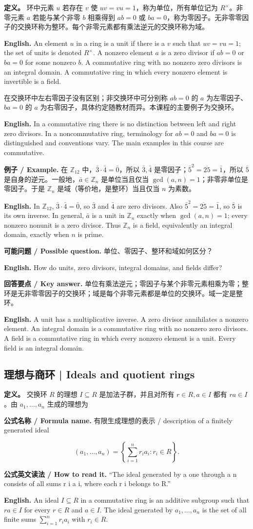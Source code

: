 \documentclass[UTF8,11pt,a4paper]{ctexart}
\newcommand{\EN}[1]{\par\noindent\textbf{English.} #1\par}
\newcommand{\READ}[1]{\par\noindent\textbf{公式英文读法 / How to read it.} #1\par}
\newcommand{\FORMULA}[2]{\par\noindent\textbf{公式名称 / Formula name.} #1 / #2\par}
\newcommand{\EX}[2]{\par\noindent\textbf{例子 / Example.} #1\par\EN{#2}}
\newcommand{\ASK}[4]{\par\noindent\textbf{可能问题 / Possible question.} #1\par\EN{#2}\noindent\textbf{回答要点 / Key answer.} #3\par\EN{#4}\medskip}
\begin{document}
\noindent\textbf{定义。} 环中元素 $u$ 若存在 $v$ 使 $uv=vu=1$，称为单位，所有单位记为 $R^\times$。非零元素 $a$ 若能与某个非零 $b$ 相乘得到 $ab=0$ 或 $ba=0$，称为零因子。无非零零因子的交换环称为整环。每个非零元素都有乘法逆元的交换环称为域。

\EN{An element $u$ in a ring is a unit if there is a $v$ such that $uv=vu=1$; the set of units is denoted $R^\times$. A nonzero element $a$ is a zero divisor if $ab=0$ or $ba=0$ for some nonzero $b$. A commutative ring with no nonzero zero divisors is an integral domain. A commutative ring in which every nonzero element is invertible is a field.}

\noindent 在交换环中左右零因子没有区别；非交换环中可分别称 $ab=0$ 的 $a$ 为左零因子、$ba=0$ 的 $a$ 为右零因子，具体约定随教材而异。本课程的主要例子为交换环。
\EN{In a commutative ring there is no distinction between left and right zero divisors. In a noncommutative ring, terminology for $ab=0$ and $ba=0$ is distinguished and conventions vary. The main examples in this course are commutative.}

\EX{在 $\mathbb Z_{12}$ 中，$\bar3\cdot\bar4=\bar0$，所以 $\bar3,\bar4$ 是零因子；$\bar5^2=\overline{25}=\bar1$，所以 $\bar5$ 是自身的逆元。一般地，$\bar a\in\mathbb Z_n$ 是单位当且仅当 $\gcd(a,n)=1$；非零非单位是零因子。于是 $\mathbb Z_n$ 是域（等价地，是整环）当且仅当 $n$ 为素数。}{In $\mathbb Z_{12}$, $\bar3\cdot\bar4=\bar0$, so $\bar3$ and $\bar4$ are zero divisors. Also $\bar5^2=\overline{25}=\bar1$, so $\bar5$ is its own inverse. In general, $\bar a$ is a unit in $\mathbb Z_n$ exactly when $\gcd(a,n)=1$; every nonzero nonunit is a zero divisor. Thus $\mathbb Z_n$ is a field, equivalently an integral domain, exactly when $n$ is prime.}

\ASK{单位、零因子、整环和域如何区分？}{How do units, zero divisors, integral domains, and fields differ?}{单位有乘法逆元；零因子与某个非零元素相乘为零；整环是无非零零因子的交换环；域是每个非零元素都是单位的交换环。域一定是整环。}{A unit has a multiplicative inverse. A zero divisor annihilates a nonzero element. An integral domain is a commutative ring with no nonzero zero divisors. A field is a commutative ring in which every nonzero element is a unit. Every field is an integral domain.}

\subsection{理想与商环 | Ideals and quotient rings}
\noindent\textbf{定义。} 交换环 $R$ 的理想 $I\subseteq R$ 是加法子群，并且对所有 $r\in R,a\in I$ 都有 $ra\in I$。由 $a_1,\ldots,a_n$ 生成的理想为
\FORMULA{有限生成理想的表示}{description of a finitely generated ideal}
\[
(a_1,\ldots,a_n)=\left\{\sum_{i=1}^n r_i a_i:r_i\in R\right\}.
\]
\READ{“The ideal generated by a one through a n consists of all sums r i a i, where each r i belongs to R.”}
\EN{An ideal $I\subseteq R$ in a commutative ring is an additive subgroup such that $ra\in I$ for every $r\in R$ and $a\in I$. The ideal generated by $a_1,\ldots,a_n$ is the set of all finite sums $\sum_{i=1}^n r_i a_i$ with $r_i\in R$.}
\end{document}
